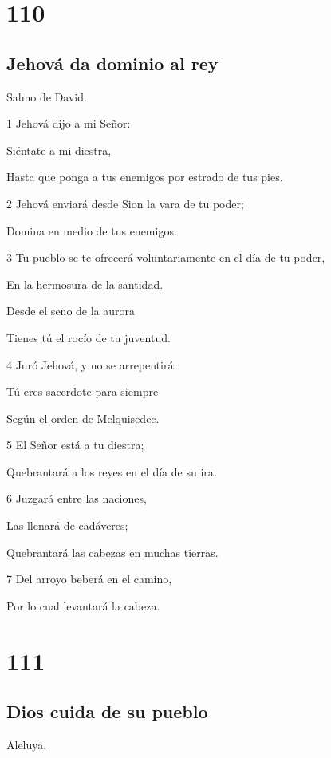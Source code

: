 \chapter{110}

\section*{Jehová da dominio al rey}

\par Salmo de David.

\par 1 Jehová dijo a mi Señor:
\par Siéntate a mi diestra,
\par Hasta que ponga a tus enemigos por estrado de tus pies.
\par 2 Jehová enviará desde Sion la vara de tu poder;
\par Domina en medio de tus enemigos.
\par 3 Tu pueblo se te ofrecerá voluntariamente en el día de tu poder,
\par En la hermosura de la santidad.
\par Desde el seno de la aurora
\par Tienes tú el rocío de tu juventud.
\par 4 Juró Jehová, y no se arrepentirá:
\par Tú eres sacerdote para siempre
\par Según el orden de Melquisedec.
\par 5 El Señor está a tu diestra;
\par Quebrantará a los reyes en el día de su ira.
\par 6 Juzgará entre las naciones,
\par Las llenará de cadáveres;
\par Quebrantará las cabezas en muchas tierras.
\par 7 Del arroyo beberá en el camino,
\par Por lo cual levantará la cabeza.

\chapter{111}

\section*{Dios cuida de su pueblo}

\par Aleluya.

